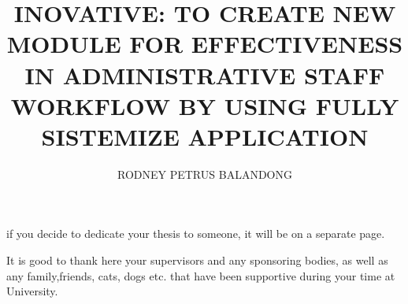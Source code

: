 
\raggedbottom 

\title{INOVATIVE: TO CREATE NEW MODULE FOR EFFECTIVENESS IN ADMINISTRATIVE STAFF WORKFLOW BY USING FULLY SISTEMIZE APPLICATION}

\author{RODNEY PETRUS BALANDONG}




\copyrightyear{\number\the\year} %



\beforepreface %


\clearpage
{}
\begin{center}
if you decide to dedicate your thesis to someone, it will be on a separate page.
\end{center}

\renewcommand\listtablename{\normalsize\normalfont\centering\vspace*{-0.5in} ACKNOWLEDGEMENTS}
\begin{singlespace} 


It is good to thank here your supervisors and any sponsoring bodies, as well as any family,friends, cats, dogs etc. that have been supportive during your time at University.
\end{singlespace}
\iftablespage
{}
{}%

\renewcommand\listtablename{\normalsize\normalfont\centering\vspace*{-0.5in} ABSTRACT}
\iftablespage
{}
{}


